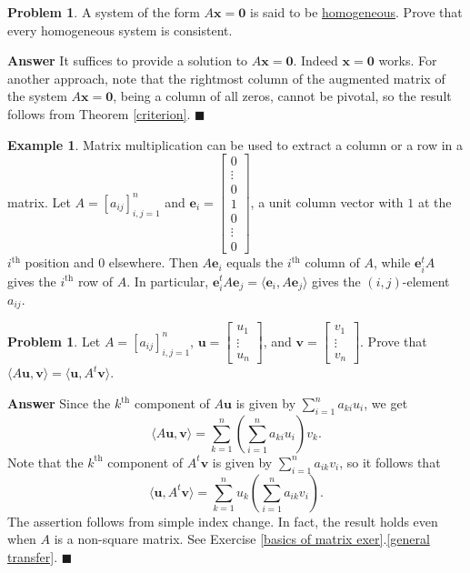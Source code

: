 \documentclass[12pt,letterpaper]{book}
\numberwithin{equation}{section}
\theoremstyle{definition}
\newtheorem{problem}[thm]{\textbf{Problem}}
\newtheorem{example}[thm]{\textbf{Example}}
\newenvironment{answer}{\noindent\textbf{Answer}}{\hfill$\blacksquare$\vspace{0.1in}}
\newcommand{\vu}{\bm{u}}
\newcommand{\vv}{\bm{v}}
\newcommand{\vx}{\bm{x}}
\newcommand{\veczero}{\bm{0}}
\begin{document}
\begin{problem}\label{homo consistent}
A system of the form $A\vx=\veczero$ is said to be \ul{homogeneous}. Prove that every homogeneous system is consistent.
\end{problem}

\begin{answer}
It suffices to provide a solution to $A\vx=\veczero$. Indeed $\vx=\veczero$ works. For another approach, note that the rightmost column of the augmented matrix of the system $A\vx=\veczero$, being a column of all zeros, cannot be pivotal, so the result follows from Theorem \ref{criterion}.
\end{answer}

\begin{example}\label{extract row col} Matrix multiplication can be used to extract a column or a row in a matrix. Let $A=[a_{ij}]_{i,j=1}^n$ and  $\bm{e}_i=\left[\begin{array}{c} 0 \\ \vdots \\ 0 \\1 \\ 0 \\ \vdots
\\ 0\end{array}\right]$, a unit column vector with $1$ at the $i^{\text{th}}$ position and $0$ elsewhere. Then $A\bm{e}_i$ equals the $i^{\text{th}}$ column of $A$, while $\bm{e}_i^tA$ gives the $i^{\text{th}}$ row of $A$. In particular, $\bm{e}_i^tA\bm{e}_j=\langle \bm{e}_i,A\bm{e}_j\rangle$ gives the $(i,j)$-element $a_{ij}$.
\end{example}

\begin{problem}\label{transfer}
Let $A=[a_{ij}]_{i,j=1}^n$, $\vu=\left[\begin{array}{c} u_1 \\ \vdots
\\ u_n \end{array}\right]$, and $\vv=\left[\begin{array}{c} v_1 \\ \vdots
\\ v_n \end{array}\right]$. Prove that $\langle A\vu, \vv\rangle=\langle \vu, A^t\vv\rangle$.
\end{problem}

\begin{answer}
Since the $k^{\text{th}}$ component of $A\vu$ is given by $\sum_{i=1}^n a_{ki}u_i$, we get
$$\langle A\vu, \vv\rangle = \sum_{k=1}^n \left(\sum_{i=1}^n a_{ki}u_i\right)v_k. $$
Note that the $k^{\text{th}}$ component of $A^t\vv$ is given by $\sum_{i=1}^n a_{ik}v_i$, so it follows that
$$\langle \vu, A^t\vv\rangle = \sum_{k=1}^n u_k \left(\sum_{i=1}^n a_{ik}v_i\right).$$
The assertion follows from simple index change. In fact, the result holds even when $A$ is a non-square matrix. See Exercise \ref{basics of matrix exer}.\ref{general transfer}.
\end{answer}
\end{document}

